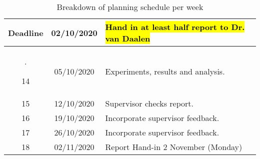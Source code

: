 \begin{table}[H]
\begin{center}
\begin{tabular}{|c|c|p{8cm}|}
      Deadline & 02/10/2020 & \hl{Hand in at least half report to Dr. van Daalen}\\ \hline.
      
      
      14 & 05/10/2020 & Experiments, results and analysis.\\ \hline
      15 & 12/10/2020 & Supervisor checks report.\\ \hline
      16 & 19/10/2020 & Incorporate supervisor feedback.\\ \hline
      17 & 26/10/2020 & Incorporate supervisor feedback.\\ \hline
      18 & 02/11/2020 &  Report Hand-in 2 November (Monday)\\ 
      
      \hline
    \end{tabular}
  \end{center}
  \caption{Breakdown of planning schedule per week}
    \label{tab:tablea1}
\end{table}
